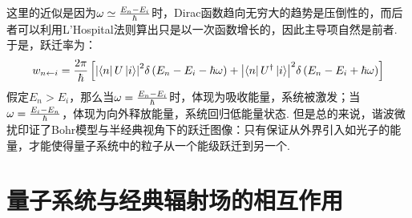 这里的近似是因为\(\omega\simeq\frac{E_{n} - E_{i}}{\hbar}\)时，Dirac函数趋向无穷大的趋势是压倒性的，而后者可以利用L'Hospital法则算出只是以一次函数增长的，因此主导项自然是前者. 于是，跃迁率为：
\[
w_{{n}\leftarrow{i}} = \frac{2\pi}{\hbar}\left[{\abs{\bra{n}U\ket{i}}^{2}\delta\left({E_{n}-E_{i} - \hbar\omega}\right)+\abs{\bra{n}U^{\dagger}\ket{i}}^{2}\delta\left({E_{n}-E_{i}+\hbar\omega}\right)}\right]
\]
假定\(E_{n}>E_{i}\)，那么当\(\omega = \frac{E_{n} - E_{i}}{\hbar}\)时，体现为吸收能量，系统被激发；当\(\omega = \frac{E_{i}-E_{n}}{\hbar}\)，体现为向外释放能量，系统回归低能量状态. 但是总的来说，谐波微扰印证了Bohr模型与半经典视角下的跃迁图像：只有保证从外界引入如光子的能量，才能使得量子系统中的粒子从一个能级跃迁到另一个. 
\section{量子系统与经典辐射场的相互作用}
